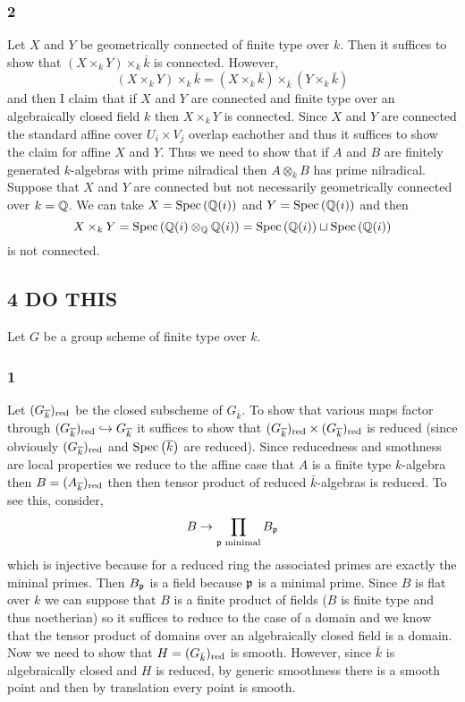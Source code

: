 \documentclass[12pt]{article}
\begin{document}
\subsubsection{2}

Let $X$ and $Y$ be geometrically connected of finite type over $k$. Then it suffices to show that $(X \times_k Y) \times_k \bar{k}$ is connected. However,
\[ (X \times_k Y) \times_k \bar{k} = (X \times_k \bar{k}) \times_{\bar{k}} (Y \times_k \bar{k}) \]
and then I claim that if $X$ and $Y$ are connected and finite type over an algebraically closed field $k$ then $X \times_k Y$ is connected. Since $X$ and $Y$ are connected the standard affine cover $U_i \times V_j$ overlap eachother and thus it suffices to show the claim for affine $X$ and $Y$. Thus we need to show that if $A$ and $B$ are finitely generated $k$-algebras with prime nilradical then $A \otimes_k B$ has prime nilradical. 
\bigskip\\
Suppose that $X$ and $Y$ are connected but not necessarily geometrically connected over $k = \mathbb{Q}$. We can take $X = \mathrm{Spec}\left( \mathbb{Q}(i) \right)$ and $Y = \mathrm{Spec}\left( \mathbb{Q}(i) \right)$ and then 
\[ X \times_k Y = \mathrm{Spec}\left( \mathbb{Q}(i) \otimes_{\mathbb{Q}} \mathbb{Q}(i) \right) = \mathrm{Spec}\left( \mathbb{Q}(i) \right) \sqcup \mathrm{Spec}\left( \mathbb{Q}(i) \right) \]
is not connected.

\subsection{4 DO THIS}

Let $G$ be a group scheme of finite type over $k$.

\subsubsection{1}

Let $(G_{\overline{k}})_{\mathrm{red}}$ be the closed subscheme of $G_{\overline{k}}$. To show that various maps factor through $(G_{\overline{k}})_{\mathrm{red}} \hookrightarrow G_{\overline{k}}$ it suffices to show that $(G_{\overline{k}})_{\mathrm{red}} \times (G_{\overline{k}})_{\mathrm{red}}$ is reduced (since obviously $(G_{\overline{k}})_{\mathrm{red}}$ and $\mathrm{Spec}\left( \overline{k} \right)$ are reduced). Since reducedness and smothness are local properties we reduce to the affine case that $A$ is a finite type $k$-algebra then $B = (A_{\overline{k}})_{\mathrm{red}}$ then then tensor product of reduced $\bar{k}$-algebras is reduced. To see this, consider,
\[ B \to \prod_{\mathfrak{p} \text{ minimal}} B_{\mathfrak{p}} \]
which is injective because for a reduced ring the associated primes are exactly the mininal primes. Then $B_{\mathfrak{p}}$ is a field because $\mathfrak{p}$ is a minimal prime. Since $B$ is flat over $k$ we can suppose that $B$ is a finite product of fields ($B$ is finite type and thus noetherian) so it suffices to reduce to the case of a domain and we know that the tensor product of domains over an algebraically closed field is a domain. 
\bigskip\\
Now we need to show that $H = (G_{\bar{k}})_{\mathrm{red}}$ is smooth. However, since $\bar{k}$ is algebraically closed and $H$ is reduced, by generic smoothness there is a smooth point and then by translation every point is smooth. 
\end{document}
